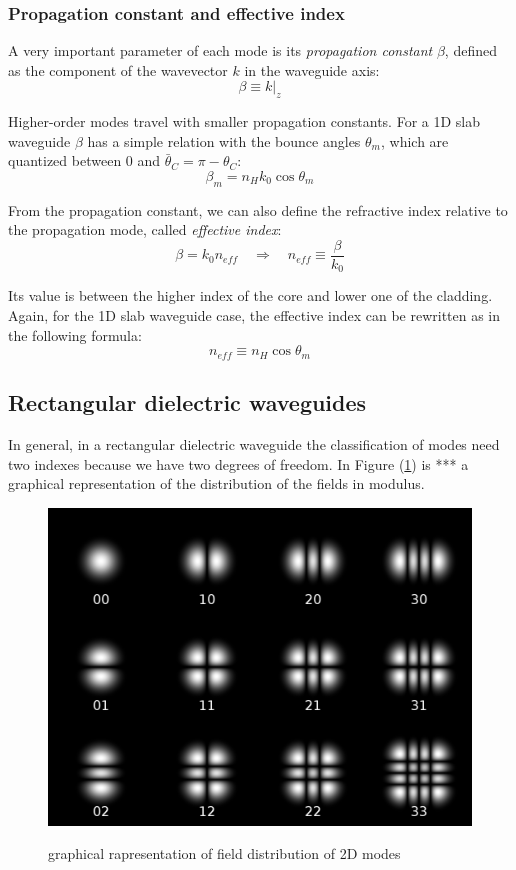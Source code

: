 \documentclass[12pt,a4paper,twoside]{article}
\begin{document}
\subsubsection*{Propagation constant and effective index}

A very important parameter of each mode is its \textit{propagation constant} $\beta$, defined as the component of the wavevector $k$ in the waveguide axis:
\begin{equation}
\beta \equiv k|_z
\end{equation}

Higher-order modes travel with smaller propagation constants.
For a 1D slab waveguide $\beta$ has a simple relation with the bounce angles $\theta_m$, which are quantized between $0$ and $\bar{\theta}_C = \pi - \theta_C$:
$$\beta_m = n_H k_0 \cos \theta_m$$

From the propagation constant, we can also define the refractive index relative to the propagation mode, called \textit{effective index}:
\begin{equation}
\beta = k_0 n_{eff} \quad \Rightarrow \quad n_{eff} \equiv \frac{\beta}{k_0}
\end{equation}

Its value is between the higher index of the core and lower one of the cladding.
Again, for the 1D slab waveguide case, the effective index can be rewritten as in the following formula:
$$ n_{eff} \equiv n_H \cos \theta_m$$

\subsection{Rectangular dielectric waveguides}
In general, in a rectangular dielectric waveguide the classification of modes need two indexes because we have two degrees of freedom.
In Figure (\ref{fig_2dmodes}) is *** a graphical representation of the distribution of the fields in modulus.

\begin{figure}[ht]
	\centering
	\includegraphics[width=.5\textwidth]{2Dmodes.png}
	\label{fig_2dmodes}
	\caption{graphical rapresentation of field distribution of 2D modes}
\end{figure}
\end{document}
